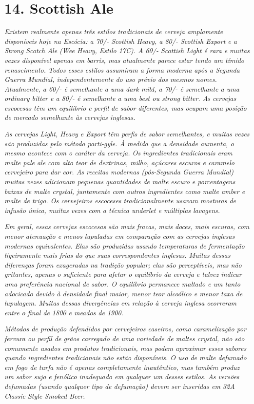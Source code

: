 \section*{14. Scottish Ale}
\textit{Existem realmente apenas três estilos tradicionais de cerveja amplamente disponíveis hoje na Escócia: a 70/- Scottish Heavy, a 80/- Scottish Export e a Strong Scotch Ale (Wee Heavy, Estilo 17C). A 60/- Scottish Light é rara e muitas vezes disponível apenas em barris, mas atualmente parece estar tendo um tímido renascimento. Todos esses estilos assumiram a forma moderna após a Segunda Guerra Mundial, independentemente do uso prévio dos mesmos nomes. Atualmente, a 60/- é semelhante a uma dark mild, a 70/- é semelhante a uma ordinary bitter e a 80/- é semelhante a uma best ou strong bitter. As cervejas escocesas têm um equilíbrio e perfil de sabor diferentes, mas ocupam uma posição de mercado semelhante às cervejas inglesas.}

\textit{As cervejas Light, Heavy e Export têm perfis de sabor semelhantes, e muitas vezes são produzidas pelo método parti-gyle. À medida que a densidade aumenta, o mesmo acontece com o caráter da cerveja. Os ingredientes tradicionais eram malte pale ale com alto teor de dextrinas, milho, açúcares escuros e caramelo cervejeiro para dar cor. As receitas modernas (pós-Segunda Guerra Mundial) muitas vezes adicionam pequenas quantidades de malte escuro e porcentagens baixas de malte crystal, juntamente com outros ingredientes como malte amber e malte de trigo. Os cervejeiros escoceses tradicionalmente usavam mosturas de infusão única, muitas vezes com a técnica underlet e múltiplas lavagens.}

\textit{Em geral, essas cervejas escocesas são mais fracas, mais doces, mais escuras, com menor atenuação e menos lupuladas em comparação com as cervejas inglesas modernas equivalentes. Elas são produzidas usando temperaturas de fermentação ligeiramente mais frias do que suas correspondentes inglesas. Muitas dessas diferenças foram exageradas na tradição popular; elas são perceptíveis, mas não gritantes, apenas o suficiente para afetar o equilíbrio da cerveja e talvez indicar uma preferência nacional de sabor. O equilíbrio permanece maltado e um tanto adocicado devido à densidade final maior, menor teor alcoólico e menor taxa de lupulagem. Muitas dessas divergências em relação à cerveja inglesa ocorreram entre o final de 1800 e meados de 1900.}

\textit{Métodos de produção defendidos por cervejeiros caseiros, como caramelização por fervura ou perfil de grãos carregado de uma variedade de maltes crystal, não são comumente usados em produtos tradicionais, mas podem aproximar esses sabores quando ingredientes tradicionais não estão disponíveis. O uso de malte defumado em fogo de turfa não é apenas completamente inautêntico, mas também produz um sabor sujo e fenólico inadequado em qualquer um desses estilos. As versões defumadas (usando qualquer tipo de defumação) devem ser inseridas em 32A Classic Style Smoked Beer. }

